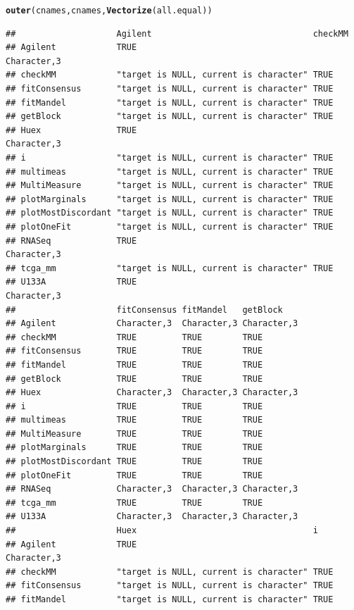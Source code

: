 \documentclass{article}\usepackage[]{graphicx}\usepackage[]{color}
\makeatletter
\newcommand{\hlstd}[1]{\textcolor[rgb]{0.345,0.345,0.345}{#1}}%
\newcommand{\hlkwd}[1]{\textcolor[rgb]{0.737,0.353,0.396}{\textbf{#1}}}%
\newenvironment{kframe}{%
 \def\at@end@of@kframe{}%
 \ifinner\ifhmode%
  \def\at@end@of@kframe{\end{minipage}}%
  \begin{minipage}{\columnwidth}%
 \fi\fi%
 \def\FrameCommand##1{\hskip\@totalleftmargin \hskip-\fboxsep
 \colorbox{shadecolor}{##1}\hskip-\fboxsep
     \hskip-\linewidth \hskip-\@totalleftmargin \hskip\columnwidth}%
 \MakeFramed {\advance\hsize-\width
   \@totalleftmargin\z@ \linewidth\hsize
   \@setminipage}}%
 {\par\unskip\endMakeFramed%
 \at@end@of@kframe}
\newenvironment{knitrout}{}{} %
\makeatother
\begin{document}
\begin{knitrout}
\begin{kframe}
\begin{alltt}
\hlkwd{outer}\hlstd{(cnames, cnames,} \hlkwd{Vectorize}\hlstd{(all.equal))}
\end{alltt}
\begin{verbatim}
##                    Agilent                                checkMM    
## Agilent            TRUE                                   Character,3
## checkMM            "target is NULL, current is character" TRUE       
## fitConsensus       "target is NULL, current is character" TRUE       
## fitMandel          "target is NULL, current is character" TRUE       
## getBlock           "target is NULL, current is character" TRUE       
## Huex               TRUE                                   Character,3
## i                  "target is NULL, current is character" TRUE       
## multimeas          "target is NULL, current is character" TRUE       
## MultiMeasure       "target is NULL, current is character" TRUE       
## plotMarginals      "target is NULL, current is character" TRUE       
## plotMostDiscordant "target is NULL, current is character" TRUE       
## plotOneFit         "target is NULL, current is character" TRUE       
## RNASeq             TRUE                                   Character,3
## tcga_mm            "target is NULL, current is character" TRUE       
## U133A              TRUE                                   Character,3
##                    fitConsensus fitMandel   getBlock   
## Agilent            Character,3  Character,3 Character,3
## checkMM            TRUE         TRUE        TRUE       
## fitConsensus       TRUE         TRUE        TRUE       
## fitMandel          TRUE         TRUE        TRUE       
## getBlock           TRUE         TRUE        TRUE       
## Huex               Character,3  Character,3 Character,3
## i                  TRUE         TRUE        TRUE       
## multimeas          TRUE         TRUE        TRUE       
## MultiMeasure       TRUE         TRUE        TRUE       
## plotMarginals      TRUE         TRUE        TRUE       
## plotMostDiscordant TRUE         TRUE        TRUE       
## plotOneFit         TRUE         TRUE        TRUE       
## RNASeq             Character,3  Character,3 Character,3
## tcga_mm            TRUE         TRUE        TRUE       
## U133A              Character,3  Character,3 Character,3
##                    Huex                                   i          
## Agilent            TRUE                                   Character,3
## checkMM            "target is NULL, current is character" TRUE       
## fitConsensus       "target is NULL, current is character" TRUE       
## fitMandel          "target is NULL, current is character" TRUE       

\end{verbatim}
\end{kframe}
\end{knitrout}
\end{document}

